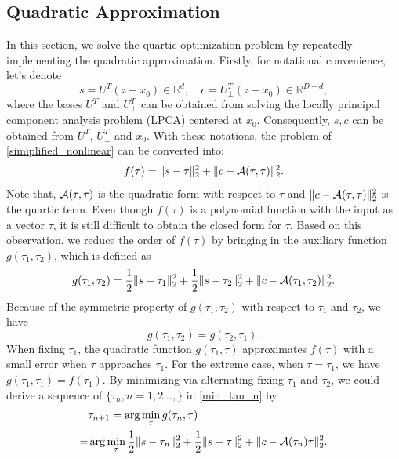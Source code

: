 \documentclass{article}
\theoremstyle{remark}
\begin{document}
\subsection{Quadratic Approximation}
In this section, we solve the quartic optimization problem by repeatedly implementing the quadratic approximation.
Firstly, for notational convenience, let's denote 
\[
s = U^T (z-x_0)\in {\mathbb R}^{d}, \quad c = U^T_{\perp}(z-x_0)\in {\mathbb R}^{D-d},
\]
where the bases $U^T$ and $U^T_{\perp}$ can be obtained from solving the locally principal component analysis problem (LPCA) centered at $x_0$. Consequently, $s, c$ can be obtained from $U^T$, $U^T_\perp$ and $x_0$.
With these notations, the problem of \eqref{simiplified_nonlinear} can be converted into:
\begin{equation}\label{f_tau}
f(\tau) = \|s-\tau\|_2^2+\|c- {{\cal A}} (\tau,\tau)\|_2^2.
\end{equation}
Note that, ${{\cal A}} (\tau,\tau)$ is the quadratic form with respect to $\tau$ and $\|c- {{\cal A}} (\tau,\tau)\|_2^2$ is the quartic term. Even though $f(\tau)$ is a polynomial function with the input as a vector $\tau$, it is still difficult to obtain the closed form for $\tau$. Based on this observation, we reduce the order of $f(\tau)$ 
by bringing in the auxiliary function $g(\tau_1,\tau_2)$, which is defined as
\[
g(\tau_1,\tau_2) =\frac{1}{2} \|s-\tau_1\|_2^2+\frac{1}{2} \|s-\tau_2\|_2^2+\|c- {\cal A} (\tau_1,\tau_2)\|_2^2.
\]
Because of the symmetric property of $g(\tau_1,\tau_2)$ with respect to $\tau_1$ and $\tau_2$, we have
\[
g(\tau_1,\tau_2) = g(\tau_2,\tau_1).
\]
When fixing $\tau_1$, the quadratic function $g(\tau_1,\tau)$ approximates $f(\tau)$ with a small error when $\tau$ approaches $ \tau_1$. For the extreme case, when $\tau=\tau_1$, we have $g(\tau_1,\tau_1)=f(\tau_1)$. By minimizing via alternating fixing $\tau_1$ and $\tau_2$, we could derive a sequence of $\{\tau_n, n=1,2...,\}$ in \eqref{min_tau_n} by
\begin{equation}\label{min_tau_n}
\begin{aligned}
&\tau_{n+1} = \arg\min_{\tau} g(\tau_{n},\tau)  \\
=&\arg\min_{\tau}\frac{1}{2}\|s-\tau_{n}\|_2^2+\frac{1}{2}\|s-\tau\|_2^2+\|c-{\cal A}(\tau_{n})\tau\|_2^2.
\end{aligned}
\end{equation}
\end{document}
